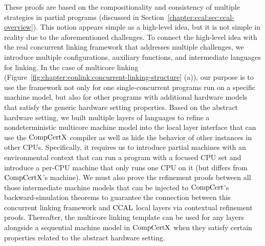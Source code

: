 These proofs are based on the compositionality and consistency of multiple strategies in partial programs (discussed in Section~\ref{chapter:ccal:sec:ccal-overview}).
This notion appears simple as a high-level idea, but it is not simple in reality due to the aforementioned challenges. 
To connect the high-level idea with the real concurrent linking framework that addresses multiple challenges, 
we introduce multiple configurations, auxiliary functions, and intermediate languages for linking. In the case of multicore linking 
(Figure~\ref{fig:chapter:conlink:concurrent-linking-structure} (a)),
our purpose is to use the framework not only for one single-concurrent programs run on a specific machine model, 
but also for other programs with additional hardware models that satisfy the generic hardware setting properties. 
Based on the abstract hardware setting, we built multiple layers of languages to refine a nondeterministic multicore machine model into the local layer interface that can use the $\mathrm{CompCertX}$ compiler as well as hide the behavior of other instances in other CPUs. 
Specifically, it requires us to introduce partial machines with an environmental context that can run a program with a focused CPU set and introduce a per-CPU machine that only runs one CPU on it (but differs from $\mathrm{CompCertX}$’s machine). 
We must also prove the refinement proofs between all those intermediate machine models that can be injected to $\mathrm{CompCert}$'s backward-simulation theorems to guarantee the connection between this concurrent linking framework and $\mathrm{CCAL}$ local layers via contextual refinement proofs. 
Thereafter, the multicore linking template can be used for any layers alongside a sequential machine model in $\mathrm{CompCertX}$ when they satisfy certain properties related to the abstract hardware setting.



